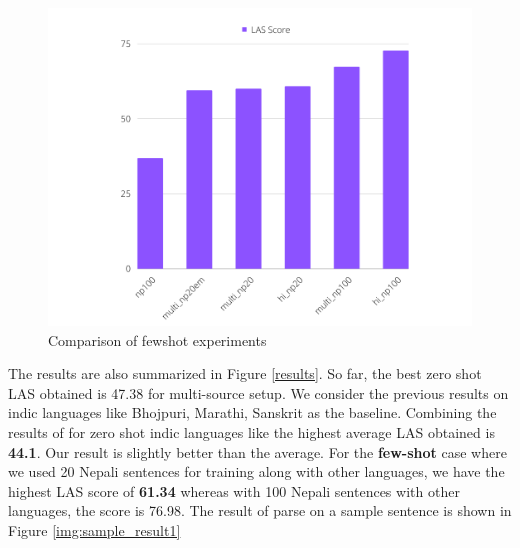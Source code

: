 \begin{figure}[!h]
    \center
    \includegraphics[scale=0.5]{images/fewshot_comparison}
    \caption{Comparison of fewshot experiments}
    \label{fewshot_comparison}
\end{figure}


The results are also summarized in Figure \ref{results}. So far, the best zero
shot LAS obtained is 47.38 for multi-source setup. We consider the previous
results on indic languages like Bhojpuri, Marathi, Sanskrit as the baseline.
Combining the results of \cite{zero-shot}\cite{udapter} for zero shot indic
languages like the highest average LAS obtained is \textbf{44.1}. Our result is
slightly better than the average. For the \textbf{few-shot} case where we used 20
Nepali sentences for training along with other languages, we have the highest
LAS score of \textbf{61.34} whereas with 100 Nepali sentences with
other languages, the score is 76.98. The result of parse on a sample sentence is shown in Figure \ref{img:sample_result1}


